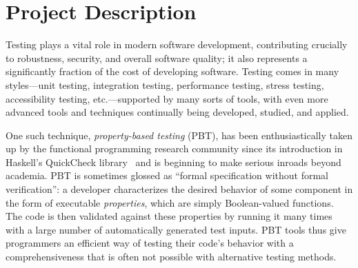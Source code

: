 \section*{Project Description}

\iflater

 


 

\fi

Testing plays a vital role in modern software development,
contributing crucially to robustness, security, and overall software
quality\iflater{}\fi; it also represents
a significantly fraction of the cost of developing
software\fi{}.
%
Testing comes in many styles---unit testing, integration testing,
performance testing, stress testing, accessibility testing,
etc.---supported by many sorts of tools, with even more advanced tools
and techniques continually being developed, studied, and applied.

One such technique, {\em property-based testing} (PBT), has been
enthusiastically taken up by the functional programming research
community since its introduction in Haskell's QuickCheck
library~\cite{ClaessenHughes00} and is beginning to make
serious inroads beyond academia.
%
PBT is sometimes glossed as ``formal specification without formal
verification'': a developer characterizes the desired behavior of
some component in the form of executable {\em
  properties}, which are simply Boolean-valued
functions\iflater{}\fi. The code is
then validated against these properties by running it many times
with a large number of automatically generated test inputs.
%
PBT tools thus give programmers an efficient way of testing their
code's behavior with a comprehensiveness that is often not
possible with alternative testing methods. \iflater{}\fi

